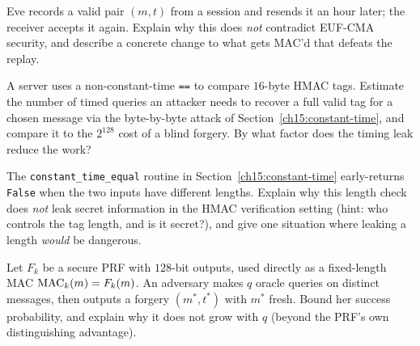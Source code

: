 \begin{exercise}
Eve records a valid pair $(m,t)$ from a session and resends it an hour later; the receiver accepts it again. Explain why this does \emph{not} contradict EUF-CMA security, and describe a concrete change to what gets MAC'd that defeats the replay.
\end{exercise}

\begin{exercise}
A server uses a non-constant-time \texttt{==} to compare $16$-byte HMAC tags. Estimate the number of timed queries an attacker needs to recover a full valid tag for a chosen message via the byte-by-byte attack of Section~\ref{ch15:constant-time}, and compare it to the $2^{128}$ cost of a blind forgery. By what factor does the timing leak reduce the work?
\end{exercise}

\begin{exercise}
The \texttt{constant\_time\_equal} routine in Section~\ref{ch15:constant-time} early-returns \texttt{False} when the two inputs have different lengths. Explain why this length check does \emph{not} leak secret information in the HMAC verification setting (hint: who controls the tag length, and is it secret?), and give one situation where leaking a length \emph{would} be dangerous.
\end{exercise}

\begin{exercise}
Let $F_k$ be a secure PRF with $128$-bit outputs, used directly as a fixed-length MAC $\operatorname{MAC}_k(m)=F_k(m)$. An adversary makes $q$ oracle queries on distinct messages, then outputs a forgery $(m^*,t^*)$ with $m^*$ fresh. Bound her success probability, and explain why it does not grow with $q$ (beyond the PRF's own distinguishing advantage).
\end{exercise}
